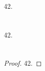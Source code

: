 \documentclass[
  coursecode={MTHE 474},
  assignmentname={Homework \homeworknumber},
  studentnumber=20053722,
  name={Bryan Hoang},
  draft,
]{
  ltxanswer%
}
\begin{document}
  \begin{questions}
    \setcounter{question}{\questionnumber}
    \addtocounter{question}{-1}
    \question[15]\
    \begin{parts}
      \part{}
      \begin{solution}
        42.
      \end{solution}

      \part{}
      \begin{solution}
        42.
      \end{solution}

      \part{}
      \begin{solution}
        \begin{proof}
          42.
        \end{proof}
      \end{solution}
    \end{parts}
  \end{questions}
\end{document}
